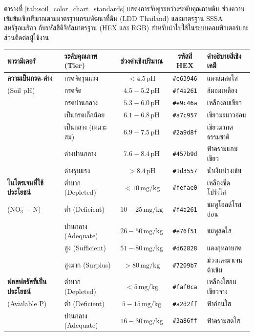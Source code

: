 ตารางที่ \ref{tab:soil_color_chart_standards} แสดงการจับคู่ระหว่างระดับคุณภาพดิน ช่วงความเข้มข้นเชิงปริมาณตามมาตรฐานกรมพัฒนาที่ดิน (LDD Thailand) และมาตรฐาน SSSA สหรัฐอเมริกา กับรหัสสีดิจิทัลมาตรฐาน (HEX และ RGB) สำหรับนำไปใช้ในระบบคอมพิวเตอร์และส่วนติดต่อผู้ใช้งาน

\begin{table}[htbp]
\centering
\small
\begin{tabularx}{\textwidth}{p{3.2cm} p{3.4cm} c c Y}
\toprule
\textbf{พารามิเตอร์} & \textbf{ระดับคุณภาพ (Tier)} & \textbf{ช่วงค่าเชิงปริมาณ} & \textbf{รหัสสี HEX} & \textbf{คำอธิบายสีเชิงเคมี} \\
\midrule
\textbf{ความเป็นกรด-ด่าง} & กรดจัดรุนแรง & $< 4.5\,\text{pH}$ & \texttt{\#e63946} & แดงส้มสดใส \\
(Soil pH) & กรดจัด & $4.5 - 5.2\,\text{pH}$ & \texttt{\#f4a261} & ส้มอมเหลือง \\
& กรดปานกลาง & $5.3 - 6.0\,\text{pH}$ & \texttt{\#e9c46a} & เหลืองอมเขียว \\
& เป็นกรดเล็กน้อย & $6.1 - 6.8\,\text{pH}$ & \texttt{\#a7c957} & เขียวมะนาวอ่อน \\
& เป็นกลาง (เหมาะสม) & $6.9 - 7.5\,\text{pH}$ & \texttt{\#2a9d8f} & เขียวมรกตธรรมชาติ \\
& ด่างปานกลาง & $7.6 - 8.4\,\text{pH}$ & \texttt{\#457b9d} & ฟ้าครามแกมเขียว \\
& ด่างรุนแรง & $> 8.4\,\text{pH}$ & \texttt{\#1d3557} & น้ำเงินม่วงเข้ม \\
\midrule
\textbf{ไนโตรเจนที่ใช้ประโยชน์} & ต่ำมาก (Depleted) & $< 10\,\text{mg/kg}$ & \texttt{\#fefae0} & เหลืองซีดโปร่งใส \\
($\text{NO}_3^--\text{N}$) & ต่ำ (Deficient) & $10 - 25\,\text{mg/kg}$ & \texttt{\#f4a261} & ชมพูโอลด์โรสอ่อน \\
& ปานกลาง (Adequate) & $26 - 50\,\text{mg/kg}$ & \texttt{\#e76f51} & ชมพูสดใส \\
& สูง (Sufficient) & $51 - 80\,\text{mg/kg}$ & \texttt{\#d62828} & แดงกุหลาบสด \\
& สูงมาก (Surplus) & $> 80\,\text{mg/kg}$ & \texttt{\#7209b7} & ม่วงแดงมาเจนต้าเข้ม \\
\midrule
\textbf{ฟอสฟอรัสที่เป็นประโยชน์} & ต่ำมาก (Depleted) & $< 5\,\text{mg/kg}$ & \texttt{\#faf0ca} & เหลืองใสอมเขียวจาง \\
(Available P) & ต่ำ (Deficient) & $5 - 15\,\text{mg/kg}$ & \texttt{\#a2d2ff} & ฟ้าอ่อนใส \\
& ปานกลาง (Adequate) & $16 - 30\,\text{mg/kg}$ & \texttt{\#3a86ff} & ฟ้าครามสดใส \\

\end{tabularx}
\end{table}

